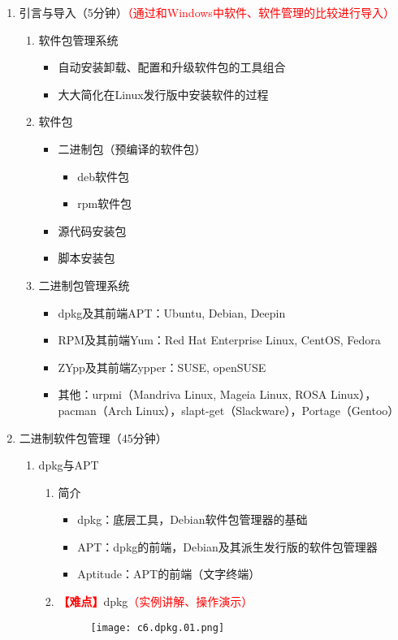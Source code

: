 \documentclass{TIJMUjiaoanLL}
\begin{document}
\begin{enumerate}
  \item
    引言与导入（5分钟）\textcolor{red}{（通过和Windows中软件、软件管理的比较进行导入）}
    \begin{enumerate}
      \item 软件包管理系统
	\begin{itemize}
	  \item 自动安装卸载、配置和升级软件包的工具组合
	  \item 大大简化在Linux发行版中安装软件的过程
	\end{itemize}
      \item 软件包
	\begin{itemize}
	  \item 二进制包（预编译的软件包）
	    \begin{itemize}
	      \item deb软件包
	      \item rpm软件包
	    \end{itemize}
	  \item 源代码安装包
	  \item 脚本安装包
	\end{itemize}
      \item 二进制包管理系统
	\begin{itemize}
          \item dpkg及其前端APT：Ubuntu, Debian, Deepin
          \item RPM及其前端Yum：Red Hat Enterprise Linux, CentOS, Fedora
          \item ZYpp及其前端Zypper：SUSE, openSUSE
          \item 其他：urpmi（Mandriva Linux, Mageia Linux, ROSA Linux），pacman（Arch Linux），slapt-get（Slackware），Portage（Gentoo）
	\end{itemize}
    \end{enumerate}

  \item 二进制软件包管理（45分钟）
    \begin{enumerate}
      \item dpkg与APT
	\begin{enumerate}
	  \item 简介
	    \begin{itemize}
	      \item dpkg：底层工具，Debian软件包管理器的基础
	      \item APT：dpkg的前端，Debian及其派生发行版的软件包管理器
	      \item Aptitude：APT的前端（文字终端）
	    \end{itemize}
	  \item \textcolor{red}{\textbf{【难点】}}dpkg\textcolor{red}{（实例讲解、操作演示）}
	    \vspace*{-10pt}
	    \begin{figure}[h]
	      \centering
	      \texttt{[image: c6.dpkg.01.png]}
	    \end{figure}
	    \vspace*{-10pt}


\end{enumerate}
\end{enumerate}
\end{enumerate}
\end{document}
